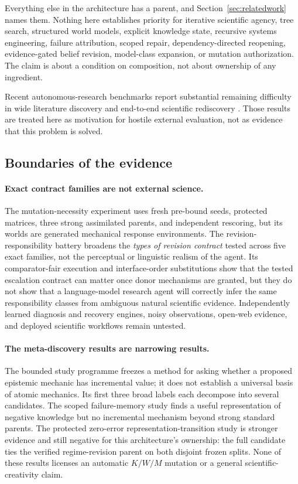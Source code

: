 Everything else in the architecture has a parent, and Section~\ref{sec:relatedwork}
names them. Nothing here establishes priority for iterative scientific agency,
tree search, structured world models, explicit knowledge state, recursive
systems engineering, failure attribution, scoped repair, dependency-directed
reopening, evidence-gated belief revision, model-class expansion, or mutation
authorization. The claim is about a condition on composition, not about
ownership of any ingredient.

Recent autonomous-research benchmarks report substantial remaining difficulty in
wide literature discovery and end-to-end scientific rediscovery
\cite{autoresearchbench2026,researchclawbench2026}. Those results are treated
here as motivation for hostile external evaluation, not as evidence that this
problem is solved.

\subsection{Boundaries of the evidence}

\paragraph{Exact contract families are not external science.}
The mutation-necessity experiment uses fresh pre-bound seeds, protected
matrices, three strong assimilated parents, and independent rescoring, but its
worlds are generated mechanical response environments. The
revision-responsibility battery broadens the \emph{types of revision contract}
tested across five exact families, not the perceptual or linguistic realism of
the agent. Its comparator-fair execution and interface-order substitutions show
that the tested escalation contract can matter once donor mechanisms are
granted, but they do not show that a language-model research agent will
correctly infer the same responsibility classes from ambiguous natural
scientific evidence. Independently learned diagnosis and recovery engines, noisy
observations, open-web evidence, and deployed scientific workflows remain
untested.

\paragraph{The meta-discovery results are narrowing results.}
The bounded study programme freezes a method for asking whether a proposed
epistemic mechanic has incremental value; it does not establish a universal
basis of atomic mechanics. Its first three broad labels each decompose into
several candidates. The scoped failure-memory study finds a useful
representation of negative knowledge but no incremental mechanism beyond strong
standard parents. The protected zero-error representation-transition study is
stronger evidence and still negative for this architecture's ownership: the full
candidate ties the verified regime-revision parent on both disjoint frozen
splits. None of these results licenses an automatic $K/W/M$ mutation or a
general scientific-creativity claim.

